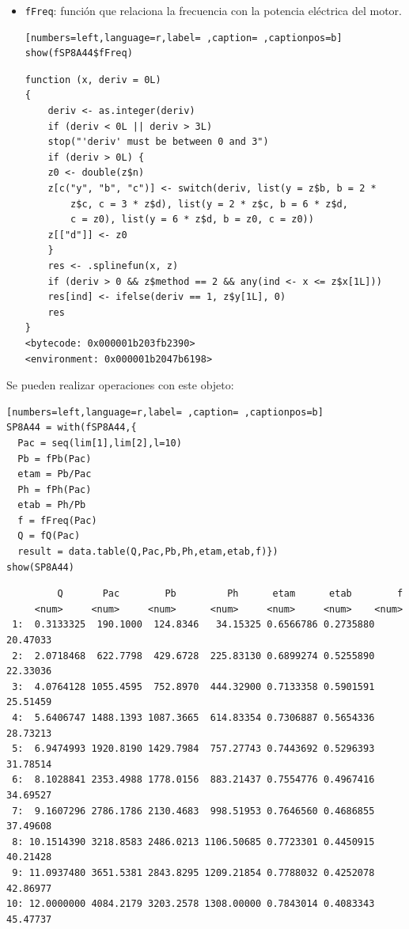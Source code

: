 \begin{itemize}
\begin{itemize}
\item \texttt{fFreq}: función que relaciona la frecuencia con la potencia eléctrica del motor.
\begin{lstlisting}[numbers=left,language=r,label= ,caption= ,captionpos=b]
show(fSP8A44$fFreq)
\end{lstlisting}

\begin{verbatim}
function (x, deriv = 0L) 
{
    deriv <- as.integer(deriv)
    if (deriv < 0L || deriv > 3L) 
	stop("'deriv' must be between 0 and 3")
    if (deriv > 0L) {
	z0 <- double(z$n)
	z[c("y", "b", "c")] <- switch(deriv, list(y = z$b, b = 2 * 
	    z$c, c = 3 * z$d), list(y = 2 * z$c, b = 6 * z$d, 
	    c = z0), list(y = 6 * z$d, b = z0, c = z0))
	z[["d"]] <- z0
    }
    res <- .splinefun(x, z)
    if (deriv > 0 && z$method == 2 && any(ind <- x <= z$x[1L])) 
	res[ind] <- ifelse(deriv == 1, z$y[1L], 0)
    res
}
<bytecode: 0x000001b203fb2390>
<environment: 0x000001b2047b6198>
\end{verbatim}
\end{itemize}

Se pueden realizar operaciones con este objeto:
\begin{lstlisting}[numbers=left,language=r,label= ,caption= ,captionpos=b]
SP8A44 = with(fSP8A44,{
  Pac = seq(lim[1],lim[2],l=10)
  Pb = fPb(Pac)
  etam = Pb/Pac
  Ph = fPh(Pac)
  etab = Ph/Pb
  f = fFreq(Pac)
  Q = fQ(Pac)
  result = data.table(Q,Pac,Pb,Ph,etam,etab,f)})
show(SP8A44)
\end{lstlisting}

\begin{verbatim}
	     Q       Pac        Pb         Ph      etam      etab        f
	 <num>     <num>     <num>      <num>     <num>     <num>    <num>
 1:  0.3133325  190.1000  124.8346   34.15325 0.6566786 0.2735880 20.47033
 2:  2.0718468  622.7798  429.6728  225.83130 0.6899274 0.5255890 22.33036
 3:  4.0764128 1055.4595  752.8970  444.32900 0.7133358 0.5901591 25.51459
 4:  5.6406747 1488.1393 1087.3665  614.83354 0.7306887 0.5654336 28.73213
 5:  6.9474993 1920.8190 1429.7984  757.27743 0.7443692 0.5296393 31.78514
 6:  8.1028841 2353.4988 1778.0156  883.21437 0.7554776 0.4967416 34.69527
 7:  9.1607296 2786.1786 2130.4683  998.51953 0.7646560 0.4686855 37.49608
 8: 10.1514390 3218.8583 2486.0213 1106.50685 0.7723301 0.4450915 40.21428
 9: 11.0937480 3651.5381 2843.8295 1209.21854 0.7788032 0.4252078 42.86977
10: 12.0000000 4084.2179 3203.2578 1308.00000 0.7843014 0.4083343 45.47737
\end{verbatim}


\end{itemize}
